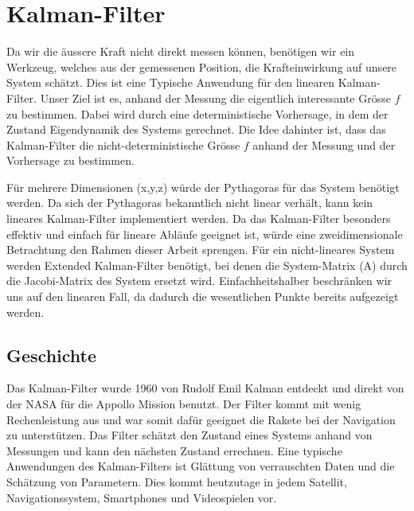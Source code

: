 %
%
%
%
%




\section{Kalman-Filter}
Da wir die äussere Kraft nicht direkt messen können, benötigen wir ein Werkzeug, welches aus der gemessenen Position, die Krafteinwirkung auf unsere System schätzt. 
Dies ist eine Typische Anwendung für den linearen Kalman-Filter.
Unser Ziel ist es, anhand der Messung die eigentlich interessante Grösse $f$ zu bestimmen. 
Dabei wird durch eine deterministische Vorhersage, in dem der Zustand \cdot Eigendynamik des Systems gerechnet. 
Die Idee dahinter ist, dass das Kalman-Filter die nicht-deterministische Grösse $f$ anhand der Messung und der Vorhersage zu bestimmen.

Für mehrere Dimensionen (x,y,z) würde der Pythagoras für das System benötigt werden.
Da sich der Pythagoras bekanntlich nicht linear verhält, kann kein lineares Kalman-Filter implementiert werden. 
Da das Kalman-Filter besonders effektiv und einfach für lineare Abläufe geeignet ist, würde eine zweidimensionale Betrachtung den Rahmen dieser Arbeit sprengen. 
Für ein nicht-lineares System werden Extended Kalman-Filter benötigt, bei denen die System-Matrix (A) durch die Jacobi-Matrix des System ersetzt wird.
Einfachheitshalber beschränken wir uns auf den linearen Fall, da dadurch die wesentlichen Punkte bereits aufgezeigt werden. 

\subsection{Geschichte}
Das Kalman-Filter wurde 1960 von Rudolf Emil Kalman entdeckt und direkt von der NASA für die Appollo Mission benutzt. Der Filter kommt mit wenig Rechenleistung aus und war somit dafür geeignet die Rakete bei der Navigation zu unterstützen. Das Filter schätzt den Zustand eines Systems anhand von Messungen und kann den nächsten Zustand errechnen. Eine typische Anwendungen des Kalman-Filters ist Glättung von verrauschten Daten und die Schätzung von Parametern. Dies kommt heutzutage in jedem Satellit, Navigationssystem, Smartphones und Videospielen vor.

